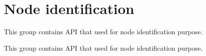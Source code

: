 \hypertarget{group__node__identification__group}{}\section{Node identification}
\label{group__node__identification__group}


This group contains A\+P\+I that used for node identification purpose.  


This group contains A\+P\+I that used for node identification purpose. 

